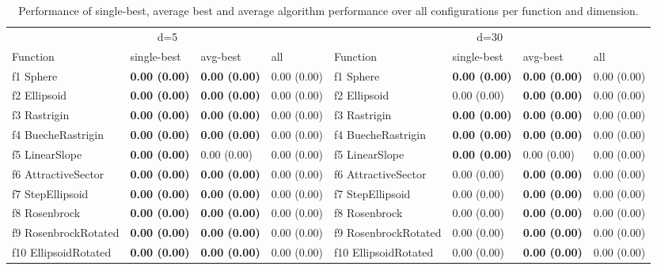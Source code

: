 \begin{table}
\caption{Performance of single-best, average best and average algorithm performance over all configurations per function and dimension.}
\begin{tabular}{llllllll}
\toprule
\multicolumn{4}{c}{d=5} & \multicolumn{4}{c}{d=30} \\
Function & single-best & avg-best & all & Function & single-best & avg-best & all \\
\midrule
f1 Sphere & \textbf{0.00 (0.00)} & \textbf{0.00 (0.00)} & 0.00 (0.00) & f1 Sphere & \textbf{0.00 (0.00)} & \textbf{0.00 (0.00)} & 0.00 (0.00) \\
f2 Ellipsoid & \textbf{0.00 (0.00)} & \textbf{0.00 (0.00)} & 0.00 (0.00) & f2 Ellipsoid & 0.00 (0.00) & \textbf{0.00 (0.00)} & 0.00 (0.00) \\
f3 Rastrigin & \textbf{0.00 (0.00)} & \textbf{0.00 (0.00)} & 0.00 (0.00) & f3 Rastrigin & \textbf{0.00 (0.00)} & \textbf{0.00 (0.00)} & 0.00 (0.00) \\
f4 BuecheRastrigin & \textbf{0.00 (0.00)} & \textbf{0.00 (0.00)} & 0.00 (0.00) & f4 BuecheRastrigin & \textbf{0.00 (0.00)} & \textbf{0.00 (0.00)} & 0.00 (0.00) \\
f5 LinearSlope & \textbf{0.00 (0.00)} & 0.00 (0.00) & 0.00 (0.00) & f5 LinearSlope & \textbf{0.00 (0.00)} & 0.00 (0.00) & 0.00 (0.00) \\
f6 AttractiveSector & \textbf{0.00 (0.00)} & \textbf{0.00 (0.00)} & 0.00 (0.00) & f6 AttractiveSector & 0.00 (0.00) & \textbf{0.00 (0.00)} & 0.00 (0.00) \\
f7 StepEllipsoid & \textbf{0.00 (0.00)} & \textbf{0.00 (0.00)} & 0.00 (0.00) & f7 StepEllipsoid & 0.00 (0.00) & \textbf{0.00 (0.00)} & 0.00 (0.00) \\
f8 Rosenbrock & \textbf{0.00 (0.00)} & \textbf{0.00 (0.00)} & 0.00 (0.00) & f8 Rosenbrock & 0.00 (0.00) & \textbf{0.00 (0.00)} & 0.00 (0.00) \\
f9 RosenbrockRotated & \textbf{0.00 (0.00)} & \textbf{0.00 (0.00)} & 0.00 (0.00) & f9 RosenbrockRotated & 0.00 (0.00) & \textbf{0.00 (0.00)} & 0.00 (0.00) \\
f10 EllipsoidRotated & \textbf{0.00 (0.00)} & \textbf{0.00 (0.00)} & 0.00 (0.00) & f10 EllipsoidRotated & 0.00 (0.00) & \textbf{0.00 (0.00)} & 0.00 (0.00) \\

\end{tabular}
\end{table}
